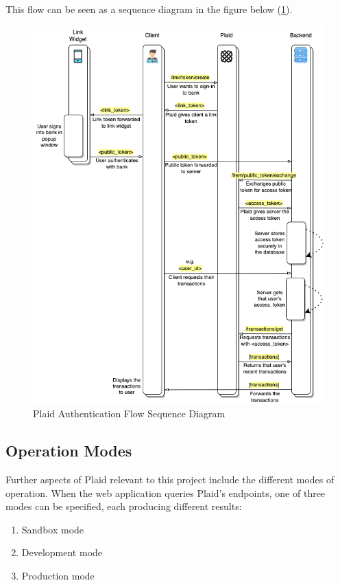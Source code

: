 This flow can be seen as a sequence diagram in the figure below (\ref{fig:plaid_auth_flow}).

\begin{figure}[H]
    \centering
    \includegraphics[width=\textwidth]{images/auth_flow_sequence_diagram.png}
    \caption{Plaid Authentication Flow Sequence Diagram}
    \label{fig:plaid_auth_flow}
\end{figure}

\subsection{Operation Modes}
\label{sec:plaid-operation-modes}
Further aspects of Plaid relevant to this project include the different modes of operation. When the web application queries Plaid's endpoints, one of three modes can be specified, each producing different results:

\begin{enumerate}
    \item Sandbox mode
    \item Development mode
    \item Production mode
\end{enumerate}

